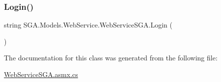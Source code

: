 \subsubsection{\texorpdfstring{Login()}{Login()}}
{\footnotesize\ttfamily string S\+G\+A.\+Models.\+Web\+Service.\+Web\+Service\+S\+G\+A.\+Login (\begin{DoxyParamCaption}{ }\end{DoxyParamCaption})}



The documentation for this class was generated from the following file\+:\begin{DoxyCompactItemize}
\item 
\hyperlink{_web_service_s_g_a_8asmx_8cs}{Web\+Service\+S\+G\+A.\+asmx.\+cs}\end{DoxyCompactItemize}
